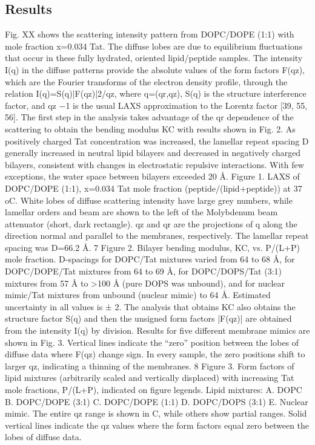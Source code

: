 \subsection{Results}
Fig. XX shows the scattering intensity pattern from DOPC/DOPE (1:1) with mole 
fraction
x=0.034 Tat. The diffuse lobes are due to equilibrium fluctuations that occur 
in these fully
hydrated, oriented lipid/peptide samples. The intensity I(q) in the diffuse 
patterns provide the
absolute values of the form factors F(qz), which are the Fourier transforms 
of the electron density
profile, through the relation I(q)=S(q)|F(qz)|2/qz, where q=(qr,qz), S(q) is 
the structure
interference factor, and qz
−1 is the usual LAXS approximation to the Lorentz factor [39, 55, 56].
The first step in the analysis takes advantage of the qr dependence of the 
scattering to obtain the
bending modulus KC with results shown in Fig. 2. As positively charged Tat 
concentration was
increased, the lamellar repeat spacing D generally increased in neutral lipid 
bilayers and
decreased in negatively charged bilayers, consistent with changes in 
electrostatic repulsive
interactions. With few exceptions, the water space between bilayers exceeded 
20 Å.
Figure 1. LAXS of DOPC/DOPE (1:1), x=0.034 Tat mole
fraction (peptide/(lipid+peptide)) at 37 oC. White lobes of
diffuse scattering intensity have large grey numbers, while
lamellar orders and beam are shown to the left of the
Molybdenum beam attenuator (short, dark rectangle). qz
and qr are the projections of q along the direction normal
and parallel to the membranes, respectively. The lamellar
repeat spacing was D=66.2 Å.
7
Figure 2. Bilayer bending modulus, KC, vs. P/(L+P) mole fraction. D-spacings 
for DOPC/Tat
mixtures varied from 64 to 68 Å, for DOPC/DOPE/Tat mixtures from 64 to 69 Å, for
DOPC/DOPS/Tat (3:1) mixtures from 57 Å to >100 Å (pure DOPS was unbound), and for
nuclear mimic/Tat mixtures from unbound (nuclear mimic) to 64 Å. Estimated uncertainty in all
values is ± 2.
The analysis that obtains KC also obtains the structure factor S(q) and then the unsigned
form factors |F(qz)| are obtained from the intensity I(q) by division. Results for five different
membrane mimics are shown in Fig. 3. Vertical lines indicate the “zero” position between the
lobes of diffuse data where F(qz) change sign. In every sample, the zero positions shift to larger
qz, indicating a thinning of the membranes.
8
Figure 3. Form factors of lipid mixtures (arbitrarily scaled and vertically displaced) with
increasing Tat mole fractions, P/(L+P), indicated on figure legends. Lipid mixtures: A. DOPC
B. DOPC/DOPE (3:1) C. DOPC/DOPE (1:1) D. DOPC/DOPS (3:1) E. Nuclear mimic. The
entire qz range is shown in C, while others show partial ranges. Solid vertical lines indicate the
qz values where the form factors equal zero between the lobes of diffuse data.

